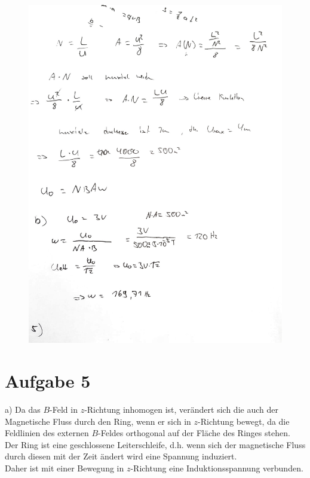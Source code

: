 \documentclass[11pt a4paper]{article}
\begin{document}
\begin{figure}[H]
	\centering
	\includegraphics[width=15cm]{4b.jpg}
\end{figure}

\newpage
\section*{Aufgabe 5}

\quad a) Da das $B$-Feld in $z$-Richtung inhomogen ist, verändert sich die 
auch der Magnetische Fluss durch den Ring, wenn er sich in $z$-Richtung
bewegt, da die Feldlinien des externen $B$-Feldes orthogonal auf der
Fläche des Ringes stehen. \\
Der Ring ist eine geschlossene Leiterschleife, d.h. wenn sich der 
magnetische Fluss durch diesen mit der Zeit ändert wird eine
Spannung induziert.\\
Daher ist mit einer Bewegung in $z$-Richtung eine Induktionsspannung
verbunden. \\
\end{document}
